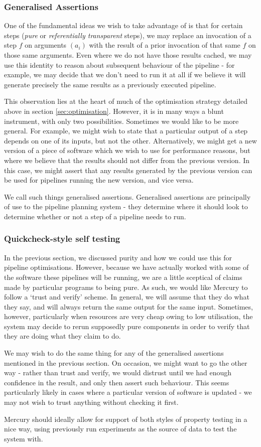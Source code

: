 \documentclass[10pt,a4paper]{article}
\newcommand{\npar}{\par\noindent\space}
\begin{document}
\subsubsection{Generalised Assertions}
\label{sec:generalisedAssertions}
\npar One of the fundamental ideas we wish to take advantage of is that for certain steps (\textit{pure} or \textit{referentially transparent} steps), we may replace an invocation of a step $ f $ on arguments $ (a_i) $ with the result of a prior invocation of that same $ f $ on those same arguments. Even where we do not have those results cached, we may use this identity to reason about subsequent behaviour of the pipeline - for example, we may decide that we don't need to run it at all if we believe it will generate precisely the same results as a previously executed pipeline.
\npar This observation lies at the heart of much of the optimisation strategy detailed above in section \ref{sec:optimisation}. However, it is in many ways a blunt instrument, with only two possibilities. Sometimes we would like to be more general. For example, we might wish to state that a particular output of a step depends on one of its inputs, but not the other. Alternatively, we might get a new version of a piece of software which we wish to use for performance reasons, but where we believe that the results should not differ from the previous version. In this case, we might assert that any results generated by the previous version can be used for pipelines running the new version, and vice versa.
\npar We call such things generalised assertions. Generalised assertions are principally of use to the pipeline planning system - they determine where it should look to determine whether or not a step of a pipeline needs to run.

\subsubsection{Quickcheck-style self testing}
\npar In the previous section, we discussed purity and how we could use this for pipeline optimisations. However, because we have actually worked with some of the software these pipelines will be running, we are a little sceptical of claims made by particular programs to being pure. As such, we would like Mercury to follow a `trust and verify' scheme. In general, we will assume that they do what they say, and will always return the same output for the same input. Sometimes, however, particularly when resources are very cheap owing to low utilisation, the system may decide to rerun supposedly pure components in order to verify that they are doing what they claim to do.
\npar We may wish to do the same thing for any of the generalised assertions mentioned in the previous section. On occasion, we might want to go the other way - rather than trust and verify, we would distrust until we had enough confidence in the result, and only then assert such behaviour. This seems particularly likely in cases where a particular version of software is updated - we may not wish to trust anything without checking it first.
\npar Mercury should ideally allow for support of both styles of property testing in a nice way, using previously run experiments as the source of data to test the system with.
\end{document}
